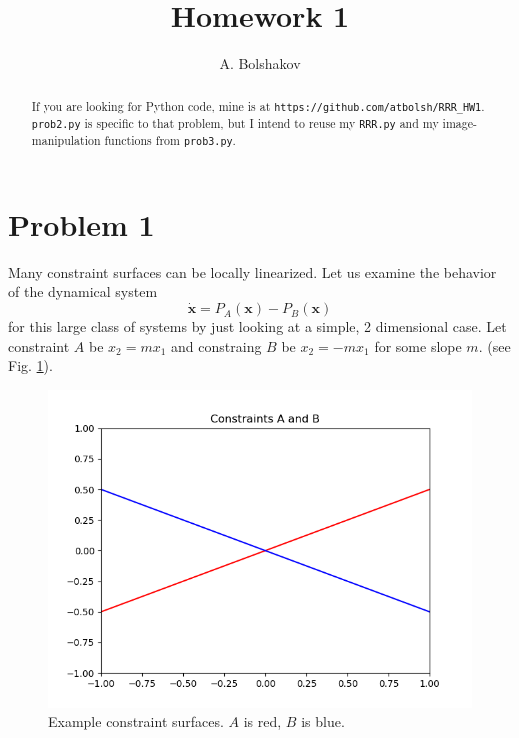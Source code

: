 \documentclass[psamsfonts]{amsart}
\title{Homework 1}
\author{A. Bolshakov}
\theoremstyle{definition}
\theoremstyle{remark}
\numberwithin{equation}{section}
\begin{document}
\maketitle


\begin{abstract}
If you are looking for Python code, mine is at \texttt{https://github.com/atbolsh/RRR\_HW1}.
\texttt{prob2.py} is specific to that problem, but I intend to reuse my 
\texttt{RRR.py} and my image-manipulation functions from \texttt{prob3.py}.
\end{abstract}

\section{Problem 1}

Many constraint surfaces can be locally linearized. 
Let us examine the behavior of the dynamical system
\[
\dot{\mathbf{x}} = P_A(\mathbf{x}) - P_B(\mathbf{x})
\]
for this large class of systems by just looking at a simple, 2 dimensional case. 
Let constraint $A$ be
$x_2 = mx_1$
and constraing $B$ be 
$x_2 = -mx_1$
for some slope $m$.
(see Fig. \ref{fig1}).




\begin{figure}
\includegraphics[scale=0.5]{Figure_1.png}
\caption{Example constraint surfaces. $A$ is red, $B$ is blue.}
\label{fig1}
\end{figure}
\end{document}
